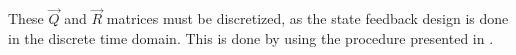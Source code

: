 These $\vec{Q}$ and $\vec{R}$ matrices must be discretized, as the state feedback design is done in the discrete time domain. This is done by using the procedure presented in \cite{lqrd}.
%
%
% 
%

